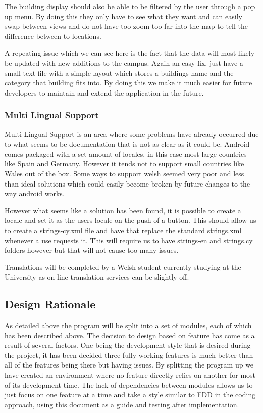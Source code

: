 The building display should also be able to be filtered by the user through a pop up menu. By doing this they only have to see what they want and can easily swap between views and do not have too zoom too far into the map to tell the difference between to locations. 

A repeating issue which we can see here is the fact that the data will most likely be updated with new additions to the campus. Again an easy fix, just have a small text file with a simple layout which stores a buildings name and the category that building fits into. By doing this we make it much easier for future developers to maintain and extend the application in the future. 

\subsubsection{Multi Lingual Support}
Multi Lingual Support is an area where some problems have already occurred due to what seems to be documentation that is not as clear as it could be. Android comes packaged with a set amount of locales, in this case most large countries like Spain and Germany. However it tends not to support small countries like Wales out of the box. Some ways to support welsh seemed very poor and less than ideal solutions which could easily become broken by future changes to the way android works.

However what seems like a solution has been found, it is possible to create a locale and set it as the users locale on the push of a button. This should allow us to create a strings-cy.xml file and have that replace the standard strings.xml whenever a use requests it. This will require us to have strings-en and strings.cy folders however but that will not cause too many issues.

Translations will be completed by a Welsh student currently studying at the University as on line translation services can be slightly off.
\subsection{Design Rationale}
As detailed above the program will be split into a set of modules, each of which has been described above. The decision to design based on feature has come as a result of several factors. One being the development style that is desired during the project, it has been decided three fully working features is much better than all of the features being there but having issues. By splitting the program up we have created an environment where no feature directly relies on another for most of its development time. The lack of dependencies between modules allows us to just focus on one feature at a time and take a style similar to FDD in the coding approach, using this document as a guide and testing after implementation.

